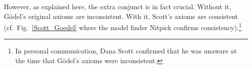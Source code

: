 \documentclass{llncs}
\begin{document}

However, as explained here, the extra conjunct is in
fact crucial. Without it, G\"odel's original axioms are
inconsistent. With it, Scott's axioms are consistent (cf.~Fig.~\ref{Scott_Goedel}
where the model finder Nitpick \cite{Nitpick} confirms consistency).\footnote{In
  personal communication, Dana Scott confirmed that he was unaware
  at the time that G\"odel's axioms were inconsistent.}




\end{document}
